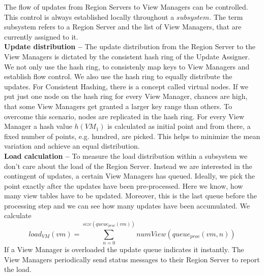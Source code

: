 \documentclass[11pt,a4paper,bibtotoc,idxtotoc,headsepline,footsepline,footexclude,BCOR12mm,DIV13]{scrbook}
\begin{document}
The flow of updates from Region Servers to View Managers can be controlled. This control is always established locally throughout a $subsystem$. The term subsystem refers to a Region Server and the list of View Managers, that are currently assigned to it.\\

\noindent  
\textbf{Update distribution -- }The update distribution from the Region Server to the View Managers is dictated by the consistent hash ring of the Update Assigner. We not only use the hash ring, to consistenly map keys to View Managers and establish flow control. We also use the hash ring to equally distribute the updates. For Consistent Hashing, there is a concept called virtual nodes. If we put just one node on the hash ring for every View Manager, chances are high, that some View Managers get granted a larger key range than others. To overcome this scenario, nodes are replicated in the hash ring. For every View Manager a hash value $h(VM_1)$ is calculated as initial point and from there, a fixed number of points, e.g. hundred, are picked. This helps to minimize the mean variation and achieve an equal distribution.\\ 

\noindent  
\textbf{Load calculation -- }To measure the load distribution within a subsystem we don't care about the load of the Region Server. Instead we are interested in the contingent of updates, a certain View Managers has queued. Ideally, we pick the point exactly after the updates have been pre-processed. Here we know, how many view tables have to be updated. Moreover, this is the last queue before the processing step and we can see how many updates have been accumulated. We calculate  \[load_{VM}(vm)=\sum_{n=0}^{size(queue_{proc}(vm))} numView(queue_{proc}(vm, n))\]If a View Manager is overloaded the update queue indicates it instantly. The View Managers periodically send status messages to their Region Server to report the load.\\  
\end{document}
